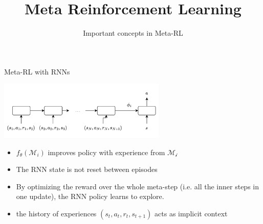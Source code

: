 \documentclass[aspectratio=169]{../latex_main/tntbeamer}  %
\title[Meta-RL]{Meta Reinforcement Learning}
\subtitle{Important concepts in Meta-RL}
\begin{document}
	
\maketitle

\begin{frame}{Meta-RL with RNNs~}
    \begin{center}
        \includegraphics[width=0.6\textwidth]{images/t04/RNN-RL.png}
    \end{center}

    \begin{itemize}
        \item $f_\theta (\mathcal{M}_i)$ improves policy with experience from $\mathcal{M_i}$
        \item The RNN state is not reset between episodes
        \item By optimizing the reward over the whole meta-step (i.e. all the inner steps in one update), the RNN policy learns to explore.
        \item the history of experiences $(s_t, a_t, r_t, s_{t+1})$ acts as implicit context
    \end{itemize}
    \vfill 
    
\end{frame}
\end{document}
